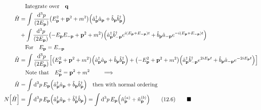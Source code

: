 \documentclass{article}
\begin{document}
\begin{align*}
                  & \qq{Integrate over}\vb{q}                                                                                                                                                                                                                                                                                                           \\
  \hat{H}         & =\int \frac{\dd[3]{p}}{(2E_{\vb{p}})}\pqty{E_{\vb{p}}^2+\vb{p}^2+m^2}\pqty{\hat{a}^\dagger_{\vb{p}}\hat{a}_{\vb{p}}+\hat{b}_{\vb{p}}\hat{b}^\dagger_{\vb{p}}}                                                                                                                                                                       \\
                  & +\int \frac{\dd[3]{p}}{(2E_{\vb{p}})}\pqty{-E_{\vb{p}}E_{\vb{-p}}+\vb{p}^2+m^2}\pqty{\hat{a}^\dagger_{\vb{p}}\hat{b}^\dagger_{\vb{-p}}e^{i(E_{\vb{p}}+E_{\vb{-p}})t}+\hat{b}_{\vb{p}}\hat{a}_{\vb{-p}}e^{-i(E_{\vb{p}}+E_{\vb{-p}})t}}                                                                                              \\
                  & \qq{For} E_{\vb{p}}=E_{\vb{-p}}                                                                                                                                                                                                                                                                                                     \\
  \hat{H}         & =\int \frac{\dd[3]{p}}{(2E_{\vb{p}})}\bqty{\pqty{E_{\vb{p}}^2+\vb{p}^2+m^2}\pqty{\hat{a}^\dagger_{\vb{p}}\hat{a}_{\vb{p}}+\hat{b}_{\vb{p}}\hat{b}^\dagger_{\vb{p}}}+\pqty{-E_{\vb{p}}^2+\vb{p}^2+m^2}\pqty{\hat{a}^\dagger_{\vb{p}}\hat{b}^\dagger_{\vb{-p}}e^{2iE_{\vb{p}}t}+\hat{b}_{\vb{p}}\hat{a}_{\vb{-p}}e^{-2iE_{\vb{p}}t}}} \\
                  & \qq{Note that}E_{\vb{p}}^2=\vb{p}^2+m^2\qquad\implies                                                                                                                                                                                                                                                                               \\
  \hat{H}         & =\int\dd[3]{p}E_{\vb{p}}\pqty{\hat{a}^\dagger_{\vb{p}}\hat{a}_{\vb{p}}+\hat{b}_{\vb{p}}\hat{b}^\dagger_{\vb{p}}}\qq{then with normal ordering}                                                                                                                                                                                      \\
  N\bqty{\hat{H}} & =\int\dd[3]{p}E_{\vb{p}}\pqty{\hat{a}^\dagger_{\vb{p}}\hat{a}_{\vb{p}}+\hat{b}^\dagger_{\vb{p}}\hat{b}_{\vb{p}}}=\int\dd[3]{p}E_{\vb{p}}\pqty{\hat{n}^{(a)}_{\vb{p}}+\hat{n}^{(b)}_{\vb{p}}}\qquad(12.6)\qquad\blacksquare
\end{align*}
\end{document}
